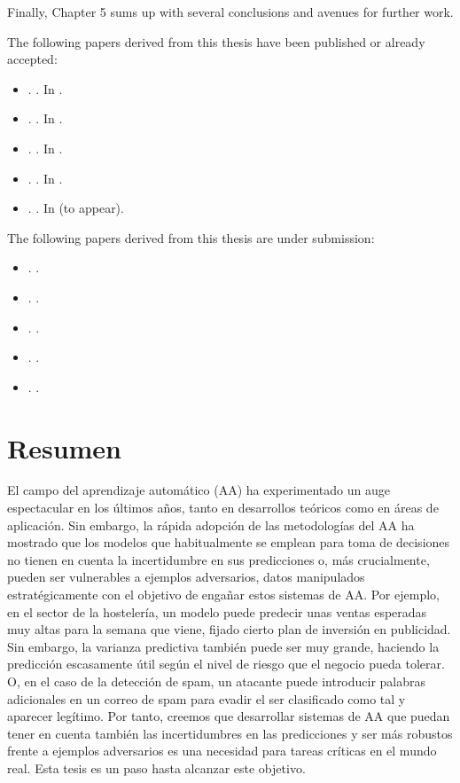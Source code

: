 \documentclass[a4paper, 11pt, openright, twoside]{reportPhD}
\numberwithin{figure}{chapter}
\numberwithin{table}{chapter}
\numberwithin{equation}{chapter}
\begin{document}
Finally, Chapter 5 sums up with several conclusions and avenues for further work.


The following papers derived from this thesis have been published or already accepted:
\begin{itemize}
    \item \cite{gallego2019dlms}. . In .
    \item \cite{gallego2019reinforcement}. . In .
     \item \cite{gallego2019vis}. . In .   
     \item \cite{math8111957}. . In .
     \item \cite{nn2022}. . In  (to appear).
\end{itemize}

The following papers derived from this thesis are under submission:
\begin{itemize}
    \item \citeauthor{gallego2019opponent}. . 
        \item \citeauthor{gallego2021data}. . 
    \item \citeauthor{gallego2018stochastic}. . 
    \item \citeauthor{AMLARA}. . 
     \item \citeauthor{gallego2020protecting}. . 
\end{itemize}

\chapter*{Resumen}

El campo del aprendizaje automático (AA) ha experimentado un auge espectacular en los últimos años, tanto en desarrollos teóricos como en áreas de aplicación. Sin embargo, la rápida adopción  de las metodologías del AA ha mostrado que los modelos que habitualmente se emplean para toma de decisiones no tienen en cuenta la incertidumbre en sus predicciones o, más crucialmente, pueden ser vulnerables a ejemplos adversarios, datos manipulados estratégicamente con el objetivo de engañar estos sistemas de AA. Por ejemplo, en el sector de la hostelería, un modelo puede predecir unas ventas esperadas muy altas para la semana que viene, fijado cierto plan de inversión en publicidad. Sin embargo, la varianza predictiva también puede ser muy grande, haciendo la predicción escasamente útil según el nivel de riesgo que el negocio pueda tolerar. O, en el caso de la detección de spam, un atacante puede introducir palabras adicionales en un correo de spam  para evadir el ser clasificado como tal y aparecer  legítimo.
Por tanto, creemos que desarrollar sistemas de AA que puedan tener en cuenta también las incertidumbres en las predicciones y ser más robustos frente a ejemplos adversarios es una necesidad para tareas críticas en el mundo real. Esta tesis es un paso hasta alcanzar este objetivo.
\end{document}
